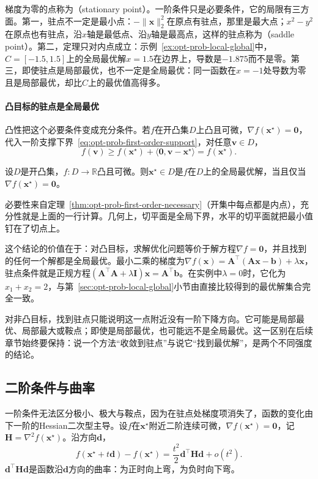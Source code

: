 梯度为零的点称为（stationary point）。一阶条件只是必要条件，它的局限有三方面。第一，驻点不一定是最小点：$-\lVert\bm x\rVert_2^2$在原点有驻点，那里是最大点；$x^2-y^2$在原点也有驻点，沿$x$轴是最低点、沿$y$轴是最高点，这样的驻点称为（saddle point）。第二，定理只对内点成立：示例~\ref{ex:opt-prob-local-global}中，$C=[-1.5,1.5]$上的全局最优解$x=1.5$在边界上，导数是$-1.875$而不是零。第三，即使驻点是局部最优，也不一定是全局最优：同一函数在$x=-1$处导数为零且是局部最优，却比$C$上的最优值高得多。

\paragraph{凸目标的驻点是全局最优}
凸性把这个必要条件变成充分条件。若$f$在开凸集$D$上凸且可微，$\nabla f(\bm x^\star)=\bm 0$，代入一阶支撑下界~\eqref{eq:opt-prob-first-order-support}，对任意$\bm v\in D$，
\[
  f(\bm v)\geq f(\bm x^\star)+\langle\bm 0,\bm v-\bm x^\star\rangle=f(\bm x^\star).
\]

\begin{theorem}[凸目标驻点的全局最优性]
\label{thm:opt-prob-convex-stationary}
设$D$是开凸集，$f:D\to\mathbb R$凸且可微。则$\bm x^\star\in D$是$f$在$D$上的全局最优解，当且仅当$\nabla f(\bm x^\star)=\bm 0$。
\end{theorem}

必要性来自定理~\ref{thm:opt-prob-first-order-necessary}（开集中每点都是内点），充分性就是上面的一行计算。几何上，切平面是全局下界，水平的切平面就把最小值钉在了切点上。

这个结论的价值在于：对凸目标，求解优化问题等价于解方程$\nabla f=\bm 0$，并且找到的任何一个解都是全局最优。最小二乘的梯度为$\nabla f(\bm x)=\bm A^\top(\bm A\bm x-\bm b)+\lambda\bm x$，驻点条件就是正规方程$(\bm A^\top\bm A+\lambda\bm I)\bm x=\bm A^\top\bm b$。在实例中$\lambda=0$时，它化为$x_1+x_2=2$，与第~\ref{sec:opt-prob-local-global}小节由直接比较得到的最优解集合完全一致。

对非凸目标，找到驻点只能说明这一点附近没有一阶下降方向。它可能是局部最优、局部最大或鞍点；即使是局部最优，也可能远不是全局最优。这一区别在后续章节始终要保持：说一个方法“收敛到驻点”与说它“找到最优解”，是两个不同强度的结论。

\subsection{二阶条件与曲率}
\label{sec:opt-prob-second-order}

一阶条件无法区分极小、极大与鞍点，因为在驻点处梯度项消失了，函数的变化由下一阶的Hessian二次型主导。设$f$在$\bm x^\star$附近二阶连续可微，$\nabla f(\bm x^\star)=\bm 0$，记$\bm H=\nabla^2f(\bm x^\star)$。沿方向$\bm d$，
\[
  f(\bm x^\star+t\bm d)-f(\bm x^\star)=\frac{t^2}{2}\bm d^\top\bm H\bm d+o(t^2).
\]
$\bm d^\top\bm H\bm d$是函数沿$\bm d$方向的曲率：为正时向上弯，为负时向下弯。


